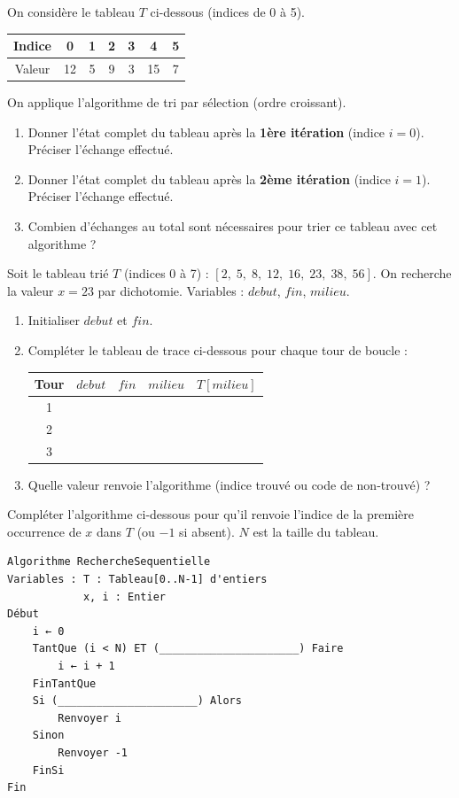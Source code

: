 \documentclass[11pt]{article}
\begin{document}
\begin{exercice}
On considère le tableau $T$ ci-dessous (indices de 0 à 5).
\begin{center}
\begin{tabular}{|c|c|c|c|c|c|c|}
\hline
Indice & 0 & 1 & 2 & 3 & 4 & 5 \\
\hline
Valeur & 12 & 5 & 9 & 3 & 15 & 7 \\
\hline
\end{tabular}
\end{center}
On applique l'algorithme de tri par sélection (ordre croissant).
\begin{enumerate}
    \item Donner l'état complet du tableau après la \textbf{1ère itération} (indice $i=0$). Préciser l'échange effectué.
    \item Donner l'état complet du tableau après la \textbf{2ème itération} (indice $i=1$). Préciser l'échange effectué.
    \item Combien d'échanges au total sont nécessaires pour trier ce tableau avec cet algorithme ?
\end{enumerate}
\end{exercice}

\begin{exercice}
Soit le tableau trié $T$ (indices 0 à 7) : $[2,\; 5,\; 8,\; 12,\; 16,\; 23,\; 38,\; 56]$.
On recherche la valeur $x = 23$ par dichotomie. Variables : $debut$, $fin$, $milieu$.
\begin{enumerate}
    \item Initialiser $debut$ et $fin$.
    \item Compléter le tableau de trace ci-dessous pour chaque tour de boucle :
    \begin{center}
    \begin{tabular}{|c|c|c|c|c|}
    \hline
    Tour & $debut$ & $fin$ & $milieu$ & $T[milieu]$ \\ \hline
    1 & & & & \\ \hline
    2 & & & & \\ \hline
    3 & & & & \\ \hline
    \end{tabular}
    \end{center}
    \item Quelle valeur renvoie l'algorithme (indice trouvé ou code de non-trouvé) ?
\end{enumerate}
\end{exercice}

\begin{exercice}
Compléter l'algorithme ci-dessous pour qu'il renvoie l'indice de la première occurrence de $x$ dans $T$ (ou $-1$ si absent). $N$ est la taille du tableau.
\begin{verbatim}
Algorithme RechercheSequentielle
Variables : T : Tableau[0..N-1] d'entiers
            x, i : Entier
Début
    i ← 0
    TantQue (i < N) ET (______________________) Faire
        i ← i + 1
    FinTantQue
    Si (______________________) Alors
        Renvoyer i
    Sinon
        Renvoyer -1
    FinSi
Fin
\end{verbatim}
\end{exercice}
\end{document}

